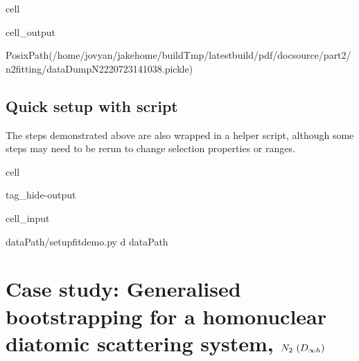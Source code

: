 \documentclass[letterpaper,table,10pt,english]{jupyterBook}
\begin{document}
\begin{sphinxuseclass}{cell}
\begin{sphinxVerbatimOutput}
\begin{sphinxuseclass}{cell_output}
\begin{sphinxVerbatim}[commandchars=\\\{\}]
PosixPath(\PYGZsq{}/home/jovyan/jake\PYGZhy{}home/buildTmp/\PYGZus{}latest\PYGZus{}build/pdf/doc\PYGZhy{}source/part2/n2fitting/dataDump\PYGZus{}N2\PYGZus{}220723\PYGZus{}14\PYGZhy{}10\PYGZhy{}38.pickle\PYGZsq{})
\end{sphinxVerbatim}

\end{sphinxuseclass}\end{sphinxVerbatimOutput}

\end{sphinxuseclass}

\section{Quick setup with script}
\label{\detokenize{part2/basic_fitting_numerics_intro_260423:quick-setup-with-script}}
\sphinxAtStartPar
The steps demonstrated above are also wrapped in a helper script, although some steps may need to be re\sphinxhyphen{}run to change selection properties or ranges.

\begin{sphinxuseclass}{cell}
\begin{sphinxuseclass}{tag_hide-output}\begin{sphinxVerbatimInput}

\begin{sphinxuseclass}{cell_input}
\begin{sphinxVerbatim}[commandchars=\\\{\}]
 \PYGZob{}dataPath/\PYGZdq{}setup\PYGZus{}fit\PYGZus{}demo.py\PYGZdq{}\PYGZcb{} \PYGZhy{}d \PYGZob{}dataPath\PYGZcb{}
\end{sphinxVerbatim}

\end{sphinxuseclass}\end{sphinxVerbatimInput}

\end{sphinxuseclass}
\end{sphinxuseclass}
\sphinxstepscope


\chapter{Case study: Generalised bootstrapping for a homonuclear diatomic scattering system, \protect\(N_2~(D_{\infty h})\protect\)}
\label{\detokenize{part2/case-study-N2_270423:case-study-generalised-bootstrapping-for-a-homonuclear-diatomic-scattering-system-n-2-d-infty-h}}\label{\detokenize{part2/case-study-N2_270423:chpt-n2-case-study}}\label{\detokenize{part2/case-study-N2_270423::doc}}
\sphinxstepscope
\end{document}
